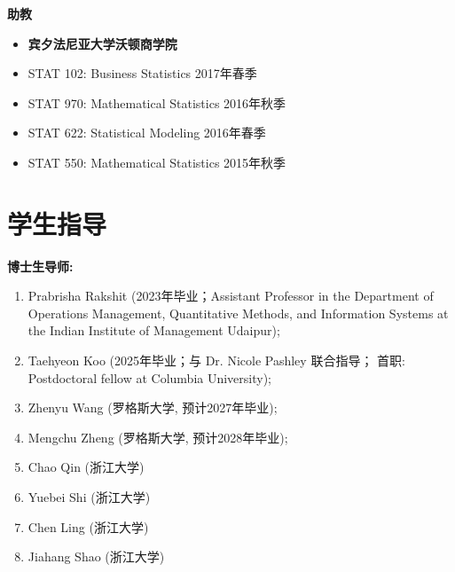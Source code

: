 \documentclass[margin, line]{res}
\begin{document}
\begin{resume}
        {\bf 助教}
        \begin{itemize}
            \item[] {\bf 宾夕法尼亚大学沃顿商学院} 

            \item[] STAT 102: Business Statistics \hfill{2017年春季}

            \item[] STAT 970: Mathematical Statistics \hfill{2016年秋季}

            \item[] STAT 622: Statistical Modeling \hfill{2016年春季}

            \item[] STAT 550: Mathematical Statistics \hfill{2015年秋季}
        \end{itemize}

		\vspace*{-3mm}

		\section{\sc 学生指导}

        {\bf 博士生导师:}
        \vspace{2mm}
        \begin{enumerate}
            \item Prabrisha Rakshit (2023年毕业；Assistant Professor in the Department
                of Operations Management, Quantitative Methods, and Information Systems at
                the Indian Institute of Management Udaipur);

            \item Taehyeon Koo (2025年毕业；与 Dr. Nicole Pashley 联合指导；
                首职: Postdoctoral fellow at Columbia University);

            \item Zhenyu Wang (罗格斯大学, 预计2027年毕业);

            \item Mengchu Zheng (罗格斯大学, 预计2028年毕业);

            \item Chao Qin (浙江大学)

            \item Yuebei Shi (浙江大学)

            \item Chen Ling (浙江大学)

            \item Jiahang Shao (浙江大学)


\end{enumerate}
\end{resume}
\end{document}
